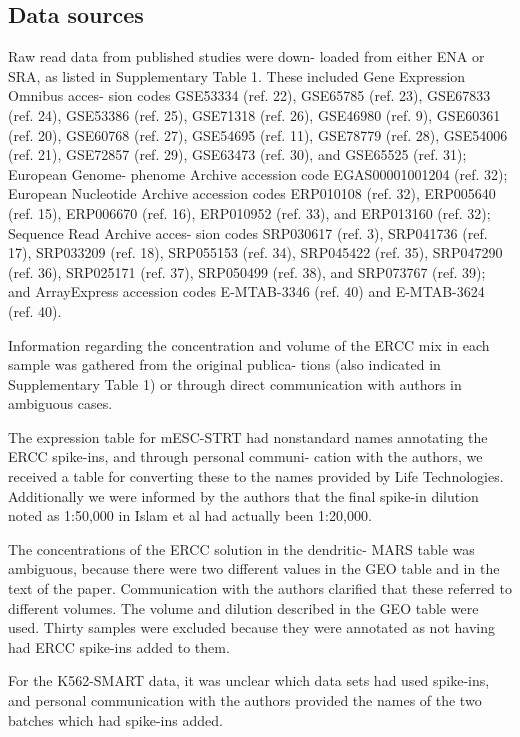 \subsection{Data sources}

Raw read data from published studies were down- loaded from either ENA or SRA, as listed in Supplementary Table 1. These included Gene Expression Omnibus acces- sion codes GSE53334 (ref. 22), GSE65785 (ref. 23), GSE67833 (ref. 24), GSE53386 (ref. 25), GSE71318 (ref. 26), GSE46980 (ref. 9), GSE60361 (ref. 20), GSE60768 (ref. 27), GSE54695 (ref. 11), GSE78779 (ref. 28), GSE54006 (ref. 21), GSE72857 (ref. 29), GSE63473 (ref. 30), and GSE65525 (ref. 31); European Genome- phenome Archive accession code EGAS00001001204 (ref. 32); European Nucleotide Archive accession codes ERP010108 (ref. 32), ERP005640 (ref. 15), ERP006670 (ref. 16), ERP010952 (ref. 33), and ERP013160 (ref. 32); Sequence Read Archive acces- sion codes SRP030617 (ref. 3), SRP041736 (ref. 17), SRP033209 (ref. 18), SRP055153 (ref. 34), SRP045422 (ref. 35), SRP047290 (ref. 36), SRP025171 (ref. 37), SRP050499 (ref. 38), and SRP073767 (ref. 39); and ArrayExpress accession codes E-MTAB-3346 (ref. 40) and E-MTAB-3624 (ref. 40).

Information regarding the concentration and volume of the ERCC mix in each sample was gathered from the original publica- tions (also indicated in Supplementary Table 1) or through direct communication with authors in ambiguous cases.

The expression table for mESC-STRT had nonstandard names annotating the ERCC spike-ins, and through personal communi- cation with the authors, we received a table for converting these to the names provided by Life Technologies. Additionally we were informed by the authors that the final spike-in dilution noted as 1:50,000 in Islam et al \cite{Islam2014-dx} had actually been 1:20,000.

The concentrations of the ERCC solution in the dendritic- MARS table was ambiguous, because there were two different values in the GEO table and in the text of the paper. Communication with the authors clarified that these referred to different volumes. The volume and dilution described in the GEO table were used. Thirty samples were excluded because they were annotated as not having had ERCC spike-ins added to them.

For the K562-SMART data, it was unclear which data sets had used spike-ins, and personal communication with the authors provided the names of the two batches which had spike-ins added.

